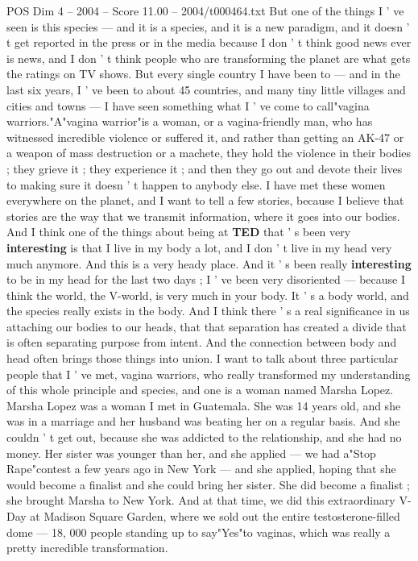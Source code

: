 \begin{textsample}{POS Dim 4 – 2004 – Score 11.00 – 2004/t000464.txt}
But one of the things I ' ve seen is this species — and it is a species, and it is a new paradigm, and it doesn ' t get reported in the press or in the media because I don ' t think good news ever is news, and I don ' t think people who are transforming the planet are what gets the ratings on TV shows.
But every single country I have been to — and in the last six years, I ' ve been to about 45 countries, and many tiny little villages and cities and towns — I have seen something what I ' ve come to call"vagina warriors."A"vagina warrior"is a woman, or a vagina-friendly man, who has witnessed incredible violence or suffered it, and rather than getting an AK-47 or a weapon of mass destruction or a machete, they hold the violence in their bodies ; they grieve it ; they experience it ; and then they go out and devote their lives to making sure it doesn ' t happen to anybody else.
I have met these women everywhere on the planet, and I want to tell a few stories, because I believe that stories are the way that we transmit information, where it goes into our bodies.
And I think one of the things about being at \textbf{TED} that ' s been very \textbf{interesting} is that I live in my body a lot, and I don ' t live in my head very much anymore.
And this is a very heady place.
And it ' s been really \textbf{interesting} to be in my head for the last two days ; I ' ve been very disoriented — because I think the world, the V-world, is very much in your body.
It ' s a body world, and the species really exists in the body.
And I think there ' s a real significance in us attaching our bodies to our heads, that that separation has created a divide that is often separating purpose from intent.
And the connection between body and head often brings those things into union.
I want to talk about three particular people that I ' ve met, vagina warriors, who really transformed my understanding of this whole principle and species, and one is a woman named Marsha Lopez.
Marsha Lopez was a woman I met in Guatemala.
She was 14 years old, and she was in a marriage and her husband was beating her on a regular basis.
And she couldn ' t get out, because she was addicted to the relationship, and she had no money.
Her sister was younger than her, and she applied — we had a"Stop Rape"contest a few years ago in New York — and she applied, hoping that she would become a finalist and she could bring her sister.
She did become a finalist ; she brought Marsha to New York.
And at that time, we did this extraordinary V-Day at Madison Square Garden, where we sold out the entire testosterone-filled dome — 18, 000 people standing up to say"Yes"to vaginas, which was really a pretty incredible transformation.

\end{textsample}
